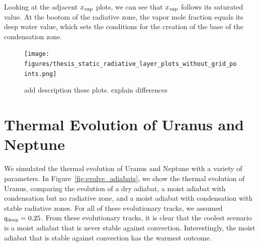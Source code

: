 \documentclass[11pt]{ucscthesisbs}
\begin{document}
Looking at the adjacent $x_{\rm vap}$ plots, we can see that $x_{\rm vap}$ follows its saturated value. At the bootom of the radiative zone, the vapor mole fraction equals its deep water value, which sets the conditions for the creation of the base of the condensation zone. 

\begin{figure}[ht]
 \centerline{
  \texttt{[image: figures/thesis\_static\_radiative\_layer\_plots\_without\_grid\_points.png]}
 }
\caption[Inhibition of convection on Uranus]
{add description these plots. explain differences}
\label{fig:radiative}
\end{figure}


\section{Thermal Evolution of Uranus and Neptune}

We simulated the thermal evolution of Uranus and Neptune with a variety of parameters. In Figure~\ref{fig:evolve_adiabats}, we show the thermal evolution of Uranus, comparing the evolution of a dry adiabat, a moist adiabat with condensation but no radiative zone, and a moist adiabat with condensation with stable radiative zones. For all of these evolutionary tracks, we assumed $q_{\rm deep} = 0.25$. From these evolutionary tracks, it is clear that the coolest scenario is a moist adiabat that is never stable against convection. Interestingly, the moist adiabat that is stable against convection has the warmest outcome.
\end{document}
